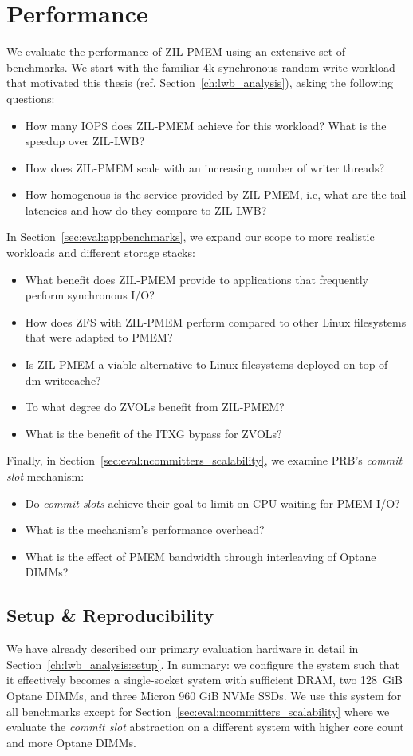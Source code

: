 \documentclass[12pt,a4paper,twoside]{book}
\begin{document}
\clearpage

\section{Performance}

We evaluate the performance of ZIL-PMEM using an extensive set of benchmarks.
We start with the familiar 4k synchronous random write workload that motivated this thesis (ref. Section~\ref{ch:lwb_analysis}), asking the following questions:
\begin{itemize}[noitemsep]
    \item How many IOPS does ZIL-PMEM achieve for this workload? What is the speedup over ZIL-LWB?
    \item How does ZIL-PMEM scale with an increasing number of writer threads?
    \item How homogenous is the service provided by ZIL-PMEM, i.e, what are the tail latencies and how do they compare to ZIL-LWB?
\end{itemize}
In Section~\ref{sec:eval:appbenchmarks}, we expand our scope to more realistic workloads and different storage stacks:
\begin{itemize}[noitemsep]
    \item What benefit does ZIL-PMEM provide to applications that frequently perform synchronous I/O?
    \item How does ZFS with ZIL-PMEM perform compared to other Linux filesystems that were adapted to PMEM?
    \item Is ZIL-PMEM a viable alternative to Linux filesystems deployed on top of dm-writecache?
    \item To what degree do ZVOLs benefit from ZIL-PMEM?
    \item What is the benefit of the ITXG bypass for ZVOLs?
\end{itemize}
Finally, in Section~\ref{sec:eval:ncommitters_scalability}, we examine PRB's \textit{commit slot} mechanism:
\begin{itemize}[noitemsep]
    \item Do \textit{commit slots} achieve their goal to limit on-CPU waiting for PMEM I/O?
    \item What is the mechanism's performance overhead?
    \item What is the effect of PMEM bandwidth through interleaving of Optane DIMMs?
\end{itemize}

\subsection{Setup \& Reproducibility}
We have already described our primary evaluation hardware in detail in Section~\ref{ch:lwb_analysis:setup}.
In summary: we configure the system such that it effectively becomes a single-socket system with sufficient DRAM, two 128~GiB Optane DIMMs, and three Micron 960 GiB NVMe SSDs.
We use this system for all benchmarks except for Section~\ref{sec:eval:ncommitters_scalability} where we evaluate the \textit{commit slot} abstraction on a different system with higher core count and more Optane DIMMs.
\end{document}
